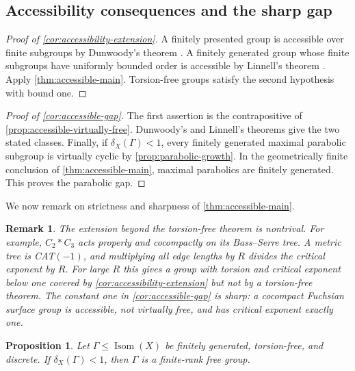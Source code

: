 \documentclass[11pt]{article}
\newtheorem{proposition}[proposition]{Proposition}
\newtheorem{remark}[remark]{Remark}
\theoremstyle{definition}
\newcommand{\Isom}{\operatorname{Isom}}
\begin{document}
\subsection{Accessibility consequences and the sharp gap}

\begin{proof}[Proof of \cref{cor:accessibility-extension}]
A finitely presented group is accessible over finite subgroups by Dunwoody's theorem
\cite{Dunwoody1985}.  A finitely generated group whose finite subgroups have uniformly
bounded order is accessible by Linnell's theorem \cite{Linnell1983}.  Apply
\cref{thm:accessible-main}.  Torsion-free groups satisfy the second hypothesis with
bound one.
\end{proof}

\begin{proof}[Proof of \cref{cor:accessible-gap}]
The first assertion is the contrapositive of
\cref{prop:accessible-virtually-free}.  Dunwoody's and Linnell's theorems give the two stated
classes.  Finally, if $\delta_X(\Gamma)<1$, every finitely generated maximal parabolic subgroup
is virtually cyclic by \cref{prop:parabolic-growth}. In the geometrically finite conclusion of
\cref{thm:accessible-main}, maximal parabolics are finitely generated.  This proves
the parabolic gap.
\end{proof}

We now remark on strictness and sharpness of  \cref{thm:accessible-main}.
\begin{remark}
\label{rem:strictness-sharpness}
The extension beyond the torsion-free theorem is nontrival.  For example,
$C_2*C_3$ acts properly and cocompactly on its Bass--Serre tree.  A metric tree is
CAT$(-1)$, and multiplying all edge lengths by $R$ divides the critical exponent by $R$.
For large $R$ this gives a group with torsion and critical exponent below one covered by
\cref{cor:accessibility-extension} but not by a torsion-free theorem.  The constant one in
\cref{cor:accessible-gap} is sharp: a cocompact Fuchsian surface group is accessible,
not virtually free, and has critical exponent exactly one.
\end{remark}

\begin{proposition}
\label{prop:small-free}
Let $\Gamma\le\Isom(X)$ be finitely generated, torsion-free, and discrete.  If
$\delta_X(\Gamma)<1$, then $\Gamma$ is a finite-rank free group.
\end{proposition}
\end{document}
